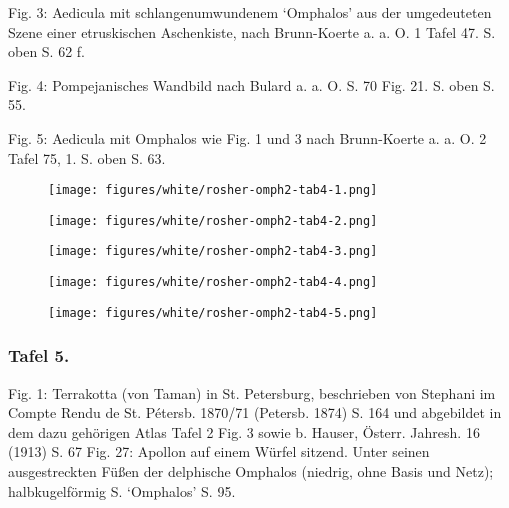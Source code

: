 \documentclass[a4paper, 11pt, oneside]{article}
\begin{document}
Fig. 3: Aedicula mit schlangenumwundenem `Omphalos' aus der umgedeuteten Szene einer etruskischen Aschenkiste, nach Brunn-Koerte a. a. O. 1 Tafel 47. S. oben S. 62 f.

Fig. 4: Pompejanisches Wandbild nach Bulard a. a. O. S. 70 Fig. 21. S. oben S. 55.

Fig. 5: Aedicula mit Omphalos wie Fig. 1 und 3 nach Brunn-Koerte a. a. O. 2 Tafel 75, 1. S. oben S. 63.
\clearpage
\vspace*{\fill}
\begin{figure}[H]
\centering
\texttt{[image: figures/white/rosher-omph2-tab4-1.png]}
\caption{}
\end{figure}
\vspace*{\fill}
\clearpage
\vspace*{\fill}
\begin{figure}[H]
\centering
\texttt{[image: figures/white/rosher-omph2-tab4-2.png]}
\caption{}
\end{figure}
\vspace*{\fill}
\clearpage
\vspace*{\fill}
\begin{figure}[H]
\centering
\texttt{[image: figures/white/rosher-omph2-tab4-3.png]}
\caption{}
\end{figure}
\vspace*{\fill}
\clearpage
\vspace*{\fill}
\begin{figure}[H]
\centering
\texttt{[image: figures/white/rosher-omph2-tab4-4.png]}
\caption{}
\end{figure}
\vspace*{\fill}
\clearpage
\vspace*{\fill}
\begin{figure}[H]
\centering
\texttt{[image: figures/white/rosher-omph2-tab4-5.png]}
\caption{}
\end{figure}
\vspace*{\fill}
\clearpage
\subsubsection{Tafel 5.}

Fig. 1: Terrakotta (von Taman) in St. Petersburg, beschrieben von Stephani im Compte Rendu de St. Pétersb. 1870/71 (Petersb. 1874) S. 164 und abgebildet in dem dazu gehörigen Atlas Tafel 2 Fig. 3 sowie b. Hauser, Österr. Jahresh. 16 (1913) S. 67 Fig. 27: Apollon auf einem Würfel sitzend. Unter seinen ausgestreckten Füßen der delphische Omphalos (niedrig, ohne Basis und Netz); halbkugelförmig S. `Omphalos' S. 95.
\end{document}
